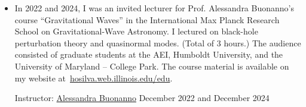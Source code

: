 \documentclass[10pt]{article}
\begin{document}
\begin{itemize}
    \item In 2022 and 2024, I was an invited lecturer for Prof. Alessandra Buonanno's course ``Gravitational Waves'' in the
    International Max Planck Research School on Gravitational-Wave Astronomy.
    I lectured on black-hole perturbation theory and quasinormal modes. (Total of 3 hours.) The audience consisted of graduate students at the AEI, Humboldt University, and the University of Maryland -- College Park.
    The course material is available on my website at~\href{https://hosilva.web.illinois.edu/edu}{hosilva.web.illinois.edu/edu}.

    Instructor: \href{https://www.aei.mpg.de/alessandra-buonanno}{Alessandra Buonanno} \hfill{December 2022 and December 2024}
\end{itemize}
\end{document}
